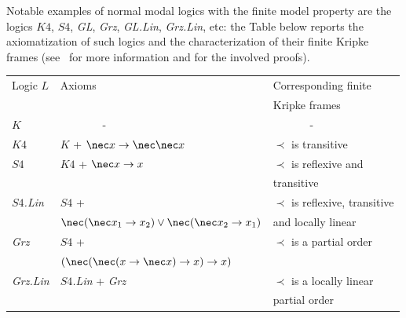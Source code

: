 \documentclass{article}
\theoremstyle{definition}
\begin{document}
Notable examples of normal modal logics with the finite model property %
are the logics $K4$, $S4$, \emph{GL}, \emph{Grz}, \emph{GL.Lin}, \emph{Grz.Lin}, etc: the Table below reports the axiomatization of such logics and the characterization of their finite Kripke frames (see~\cite{Modal} for more information and for the involved proofs).


\begin{table}\label{table:logics}
\begin{tabular}{||l|l|l||}  \hline
Logic  $L$       &    Axioms      & Corresponding finite  \\
                 &                &  Kripke frames \\ \hline
 $K$        & ~~~~~~~  - &~~~~~~ - \\ \hline
 $K4$        &  $K$ + $\nec x \to \nec \nec x$ & $\prec$ is transitive  \\
                     \hline
 $S4$        &   $K4$ + $\nec x \to x$ & $\prec$ is reflexive and \\
                 &                             &  transitive   \\
                                         \hline
 $S4$\emph{.Lin}      &   $S4$ +  & $\prec$ is reflexive, transitive  \\
                 &    $\nec (\nec x_1 \to x_2) \vee \nec (\nec x_2 \to x_1)$  & and locally linear  \\ \hline
 \emph{Grz}      &   $S4$ +  & $\prec$ is a partial order \\
                 &    $(\nec (\nec (x \to \nec x) \to x) \to x)$ &  \\ \hline
 \emph{Grz.Lin}      &   $S4$\emph{.Lin} + \emph{Grz}  & $\prec$ is a locally linear \\
                 &     & partial order \\ \hline

\end{tabular}
\end{table}
\end{document}
